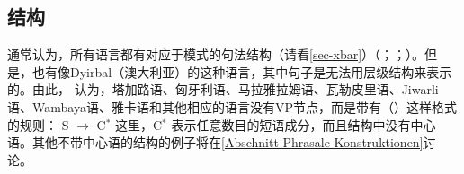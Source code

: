 
\subsection{\xbar 结构}
\label{sec-Diskussion-X-Bar}

通常认为，所有语言都有对应于\xbarc 模式的句法结构（请看\ref{sec-xbar}）（\citealp[]{Pinker94a}；\citealp[, 14]{Meisel95a}；\citealp[]{PJ2005a}）。但是，也有像Dyirbal（澳大利亚）的这种语言，其中句子是无法用层级结构来表示的。由此， \citet[]{Bresnan2001a}认为，塔加路语、匈牙利语、马拉雅拉姆语、瓦勒皮里语、Jiwarli语、Wambaya语、雅卡语和其他相应的语言没有VP节点，而是带有（）这样格式的规则：
\ea
S $\to$ C$^*$
\z
这里，C$^*$ 表示任意数目的短语成分，而且结构中没有中心语。其他不带中心语的结构的例子将在\ref{Abschnitt-Phrasale-Konstruktionen}讨论。

